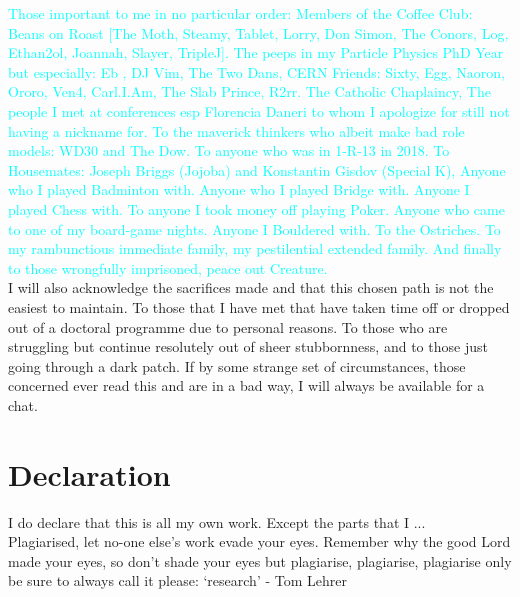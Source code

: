 \documentclass[12pt,titlepage,oneside]{book}
\newcommand{\tcc}[1]{\textcolor{cyan}{#1}} %
\begin{document}
\tcc{Those important to me in no particular order:  Members of the Coffee Club: Beans on Roast [The Moth, Steamy, Tablet, Lorry, Don Simon, The Conors, Log, Ethan2ol, Joannah, Slayer, TripleJ]. The peeps in my Particle Physics PhD Year but especially: Eb , DJ Vim, The Two Dans, CERN Friends: Sixty, Egg, Naoron, Ororo, Ven4, Carl.I.Am, The Slab Prince, R2rr. The Catholic Chaplaincy, The people I met at conferences esp Florencia Daneri to whom I apologize for still not having a nickname for. To the maverick thinkers who albeit make bad role models: WD30 and The Dow. To anyone who was in 1-R-13 in 2018. To Housemates: Joseph Briggs (Jojoba) and Konstantin Gisdov (Special K), Anyone who I played Badminton with. Anyone who I played Bridge with. Anyone I played Chess with. To anyone I took money off playing Poker. Anyone who came to one of my board-game nights. Anyone I Bouldered with. To the Ostriches. To my rambunctious immediate family, my pestilential extended family. And finally to those wrongfully imprisoned, peace out Creature.}\\

I will also acknowledge the sacrifices made and that this chosen path is not the easiest to maintain. To those that I have met that have taken time off or dropped out of a doctoral programme due to personal reasons. To those who are struggling but continue resolutely out of sheer stubbornness, and to those just going through a dark patch. If by some strange set of circumstances, those concerned ever read this and are in a bad way, I will always be available for a chat.\\

\chapter{Declaration}
I do declare that this is all my own work. Except the parts that I ... \\ Plagiarised, let no-one else's work evade your eyes. Remember why the good Lord made your eyes, so don't shade your eyes but plagiarise, plagiarise, plagiarise only be sure to always call it please: `research' - Tom Lehrer

\singlespacing

\tableofcontents
\cleardoublepage

{}
\listoffigures
\cleardoublepage

{}
\listoftables
\end{document}
